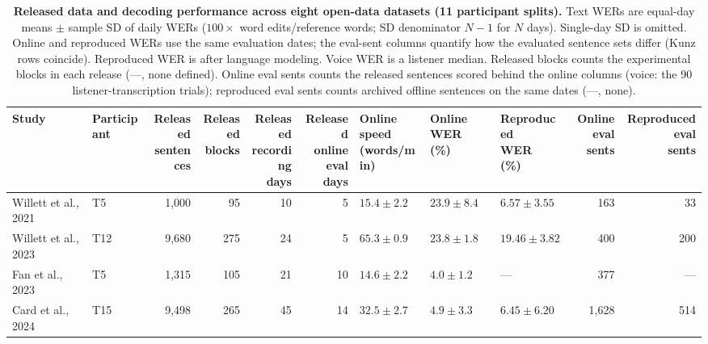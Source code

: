 \documentclass[11pt]{article}
\begin{document}
\begin{table}[t]
\centering
\footnotesize
\setlength{\tabcolsep}{3pt}
\renewcommand{\arraystretch}{1.12}
\caption{\textbf{Released data and decoding performance across eight
open-data datasets (11 participant splits).}
Text WERs are equal-day means $\pm$ sample SD of daily WERs
($100\times$ word edits/reference words; SD denominator $N-1$ for $N$ days).
Single-day SD is omitted. Online and reproduced WERs use the same evaluation
dates; the eval-sent columns quantify how the evaluated sentence sets differ (Kunz rows coincide). Reproduced WER is after language modeling.
Voice WER is a listener median. Released blocks counts the experimental blocks in each release (---, none defined). Online eval sents counts the released sentences scored behind the online columns (voice: the 90 listener-transcription trials); reproduced eval sents counts archived offline sentences on the same dates (---, none).}
\label{tab:repro}
\begin{tabular}{@{}>{\raggedright\arraybackslash}p{3.50cm}lrrrrlllrr@{}}
\toprule
Study & Participant & \shortstack[r]{Released\\sentences} & \shortstack[r]{Released\\blocks} & \shortstack[r]{Released\\recording\\days} & \shortstack[r]{Released\\online eval\\days} & \shortstack[l]{Online speed\\(words/min)} & \shortstack[l]{Online WER\\(\%)} & \shortstack[l]{Reproduced\\WER (\%)} & \shortstack[r]{Online eval\\sents} & \shortstack[r]{Reproduced eval\\sents} \\
\midrule
Willett et al., 2021 \cite{willett2021} & T5 & 1{,}000 & 95 & 10 & 5 & $15.4{\pm}2.2$ & $23.9{\pm}8.4$ & $6.57{\pm}3.55$ & 163 & 33 \\
Willett et al., 2023 \cite{willett2023} & T12 & 9{,}680 & 275 & 24 & 5 & $65.3{\pm}0.9$ & $23.8{\pm}1.8$ & $19.46{\pm}3.82$ & 400 & 200 \\
Fan et al., 2023 \cite{fan2023} & T5 & 1{,}315 & 105 & 21 & 10 & $14.6{\pm}2.2$ & $4.0{\pm}1.2$ & --- & 377 & --- \\
Card et al., 2024 \cite{card2024} & T15 & 9{,}498 & 265 & 45 & 14 & $32.5{\pm}2.7$ & $4.9{\pm}3.3$ & $6.45{\pm}6.20$ & 1{,}628 & 514 \\

\end{tabular}
\end{table}
\end{document}
